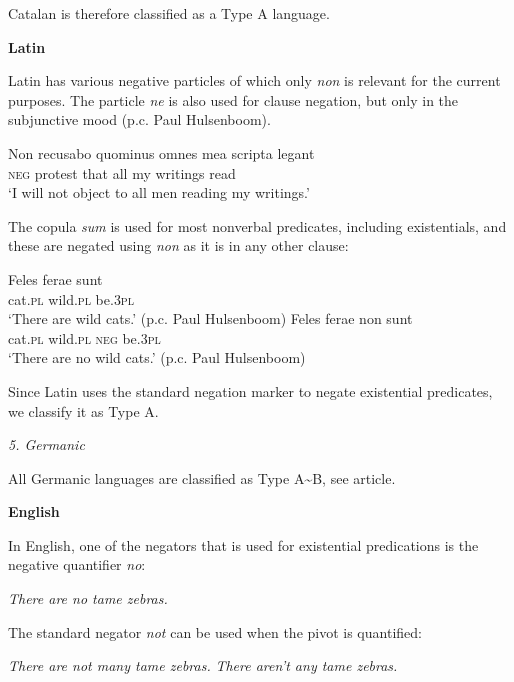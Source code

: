 \documentclass[output=paper]{langsci/langscibook}
\begin{document}
\begin{unindented}
Catalan is therefore classified as a Type A language. 

\textbf{Latin}

Latin has various negative particles \parencite[129]{GreenoughKittredge1903} of which only \textit{non} is relevant for the current purposes. The particle \textit{ne} is also used for clause negation, but only in the subjunctive mood (p.c. Paul Hulsenboom).
%
\begin{exe}\ex \gll Non recusabo quominus omnes mea scripta   legant \\
\textsc{neg} protest that all my writings read \\
    \glt `I will not object to all men reading my writings.'
\textcite[145]{Roby1862}
    \end{exe}

The copula \textit{sum} is used for most nonverbal predicates, including existentials, and these are negated using \textit{non} as it is in any other clause:
%
\begin{exe}\ex \gll Feles  ferae    sunt \\
cat.\textsc{pl} wild.\textsc{pl} be.\textsc{3pl} \\
    \glt `There are wild cats.' (p.c. Paul Hulsenboom)
\ex \gll Feles  ferae non sunt \\
cat.\textsc{pl} wild.\textsc{pl} \textsc{neg} be.\textsc{3pl} \\
    \glt `There are no wild cats.' (p.c. Paul Hulsenboom)
    \end{exe}

Since Latin uses the standard negation marker to negate existential predicates, we classify it as Type A. 

\textit{5. Germanic}

All Germanic languages are classified as Type A{\textasciitilde}B, see article.

\textbf{English}

In English, one of the negators that is used for existential predications is the negative quantifier \textit{no}: 
%
\begin{exe}\ex \textit{There are no tame zebras.}
    \end{exe}

The standard negator \textit{not} can be used when the pivot is quantified:
%
\begin{exe}\ex \begin{xlist}
\ex \textit{There are not many tame zebras.}
\ex \textit{There aren’t any tame zebras.}
    \end{xlist}\end{exe}


\end{unindented}
\end{document}
